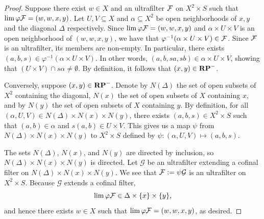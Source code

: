 \begin{proof}
\leanok{}
    Suppose there exist $w \in X$ and an ultrafilter $\mathcal{F}$ on $X^2 \times S$ such that $\lim \varphi \mathcal{F} = (w,w,x,y)$.  Let $U, V \subseteq X$ and $\alpha \subseteq X^2$ be open neighborhoods of $x, y$ and the diagonal $\Delta$ respectively. Since $\lim \varphi \mathcal{F} = (w,w,x,y)$ and $\alpha \times U \times V$ is an open neighborhood of $(w,w,x,y)$, we have that $\varphi^{-1} (\alpha \times U \times V) \in \mathcal{F}$.  Since $\mathcal{F}$ is an ultrafilter, its members are non-empty.  In particular, there exists $(a,b,s) \in \varphi^{-1} (\alpha \times U \times V)$.  In other words, $(a,b,sa,sb) \in \alpha \times U \times V$, showing that $(U \times V) \cap s \alpha \neq \emptyset$.  By definition, it follows that $(x,y) \in \mathbf{RP}^-$.

    Conversely, suppose $(x,y) \in \mathbf{RP}^-$.  Denote by $N(\Delta)$ the set of open subsets of $X^2$ containing the diagonal, $N(x)$ the set of open subsets of $X$ containing $x$, and by $N(y)$ the set of open subsets of $X$ containing $y$.  By definition, for all $(\alpha, U, V) \in N(\Delta) \times N(x) \times N(y)$, there exists $(a, b, s) \in X^2 \times S$ such that $(a,b) \in \alpha$ and $s (a,b) \in U \times V$. This gives us a map $\psi$ from $N(\Delta) \times N(x) \times N(y)$ to $X^2 \times S$ defined by $\psi: (\alpha, U, V) \mapsto (a,b,s)$.

    
    The sets $N(\Delta)$, $N(x)$, and $N(y)$ are directed by inclusion, so $N(\Delta) \times N(x) \times N(y)$ is directed.  Let $\mathcal{G}$ be an ultrafilter extending a cofinal filter on $N(\Delta) \times N(x) \times N(y)$. We see that $\mathcal{F} \vcentcolon= \psi \mathcal{G}$ is an ultrafilter on $X^2 \times S$.  Because $\mathcal{G}$ extends a cofinal filter,
    \[
        \lim \varphi \mathcal{F} \in \Delta \times \{x\} \times \{y\},
    \]
    and hence there exists $w \in X$ such that $\lim \varphi \mathcal{F} = (w,w,x,y)$, as desired.
\end{proof}

